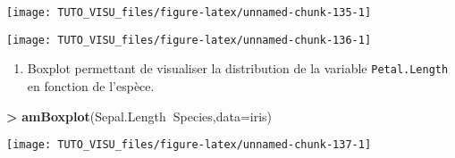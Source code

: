 \documentclass[]{book}
\newenvironment{Shaded}{\begin{snugshade}}{\end{snugshade}}
\newcommand{\DataTypeTok}[1]{\textcolor[rgb]{0.13,0.29,0.53}{#1}}
\newcommand{\KeywordTok}[1]{\textcolor[rgb]{0.13,0.29,0.53}{\textbf{#1}}}
\newcommand{\NormalTok}[1]{#1}
\newcommand{\OperatorTok}[1]{\textcolor[rgb]{0.81,0.36,0.00}{\textbf{#1}}}
\newcommand{\StringTok}[1]{\textcolor[rgb]{0.31,0.60,0.02}{#1}}
\providecommand{\tightlist}{%
  \setlength{\itemsep}{0pt}\setlength{\parskip}{0pt}}
\theoremstyle{definition}
\theoremstyle{definition}
\theoremstyle{definition}
\theoremstyle{remark}
\begin{document}
\begin{center}\texttt{[image: TUTO\_VISU\_files/figure-latex/unnamed-chunk-135-1]} \end{center}

\begin{Shaded}
\end{Shaded}

\begin{center}\texttt{[image: TUTO\_VISU\_files/figure-latex/unnamed-chunk-136-1]} \end{center}

\begin{enumerate}
\def\labelenumi{\arabic{enumi}.}
\setcounter{enumi}{1}
\tightlist
\item
  Boxplot permettant de visualiser la distribution de la variable \texttt{Petal.Length} en fonction de l'espèce.
\end{enumerate}

\begin{Shaded}
\begin{Highlighting}[]
\OperatorTok{>}\StringTok{ }\KeywordTok{amBoxplot}\NormalTok{(Sepal.Length}\OperatorTok{~}\NormalTok{Species,}\DataTypeTok{data=}\NormalTok{iris)}
\end{Highlighting}
\end{Shaded}

\begin{center}\texttt{[image: TUTO\_VISU\_files/figure-latex/unnamed-chunk-137-1]} \end{center}

\begin{Shaded}
\end{Shaded}
\end{document}
